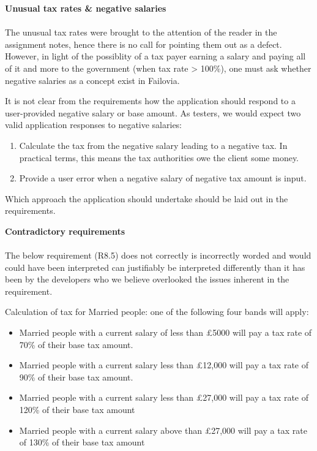\textbf{Unusual tax rates \& negative salaries \\}
\\
The unusual tax rates were brought to the attention of the reader in the assignment notes, hence there is no call for pointing them out as a defect. However, in light of the possiblity of a tax payer earning a salary and paying all of it and more to the government (when tax rate > 100\%), one must ask whether negative salaries as a concept exist in Failovia. 
\par
It is not clear from the requirements how the application should respond to a user-provided negative salary or base amount. As testers, we would expect two valid application responses to negative salaries: 

\begin{enumerate}
	\item Calculate the tax from the negative salary leading to a negative tax. In practical terms, this means the tax authorities owe the client some money.
	\item Provide a user error when a negative salary of negative tax amount is input. 
\end{enumerate}

Which approach the application should undertake should be laid out in the requirements.

\textbf{Contradictory requirements\\}
\\
The below requirement (R8.5) does not correctly  is incorrectly worded and would could have been interpreted  can justifiably be interpreted differently than it has been by the developers who we believe overlooked the issues inherent in the requirement. 
\par
Calculation of tax for Married people: one of the following four bands will apply:
\begin{itemize}[noitemsep]
	\item Married people with a current salary of less than £5000 will pay a tax rate of
	70\% of their base tax amount.
	\item Married people with a current salary less than £12,000 will pay a tax rate of
	90\% of their base tax amount.
	\item Married people with a current salary less than £27,000 will pay a tax rate of
	120\% of their base tax amount
	\item Married people with a current salary above than £27,000 will pay a tax rate
	of 130\% of their base tax amount
\end{itemize}	

